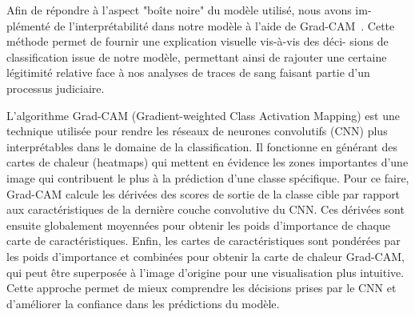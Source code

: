 Afin de répondre à l'aspect "boîte noire" du modèle utilisé, nous avons im-
plémenté de l'interprétabilité dans notre modèle à l'aide de Grad-CAM~\cite{GRADCAM}.
Cette méthode permet de fournir une explication visuelle vis-à-vis des déci-
sions de classification issue de notre modèle, permettant ainsi de rajouter une
certaine légitimité relative face à nos analyses de traces de sang faisant partie
d'un processus judiciaire. 

L'algorithme Grad-CAM (Gradient-weighted Class Activation Mapping) est une technique utilisée pour rendre les réseaux de neurones convolutifs (CNN) plus interprétables dans le domaine de la classification.
Il fonctionne en générant des cartes de chaleur (heatmaps) qui mettent en évidence les zones importantes d'une image qui contribuent le plus à la prédiction d'une classe spécifique.
Pour ce faire, Grad-CAM calcule les dérivées des scores de sortie de la classe cible par rapport aux caractéristiques de la dernière couche convolutive du CNN.
Ces dérivées sont ensuite globalement moyennées pour obtenir les poids d'importance de chaque carte de caractéristiques.
Enfin, les cartes de caractéristiques sont pondérées par les poids d'importance et combinées pour obtenir la carte de chaleur Grad-CAM, qui peut être superposée à l'image d'origine pour une visualisation plus intuitive.
Cette approche permet de mieux comprendre les décisions prises par le CNN et d'améliorer la confiance dans les prédictions du modèle.


